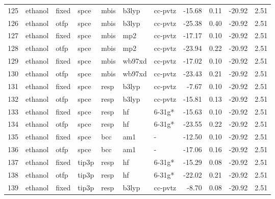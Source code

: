 \begin{tabular}{lllllllrrrr}
125 &                       ethanol &  fixed &   spce &   mbis &   b3lyp &      cc-pvtz &      -15.68 &     0.11 &      -20.92 &      2.51 \\
126 &                       ethanol &   otfp &   spce &   mbis &   b3lyp &      cc-pvtz &      -25.38 &     0.40 &      -20.92 &      2.51 \\
127 &                       ethanol &  fixed &   spce &   mbis &     mp2 &      cc-pvtz &      -17.17 &     0.10 &      -20.92 &      2.51 \\
128 &                       ethanol &   otfp &   spce &   mbis &     mp2 &      cc-pvtz &      -23.94 &     0.22 &      -20.92 &      2.51 \\
129 &                       ethanol &  fixed &   spce &   mbis &  wb97xd &      cc-pvtz &      -17.02 &     0.10 &      -20.92 &      2.51 \\
130 &                       ethanol &   otfp &   spce &   mbis &  wb97xd &      cc-pvtz &      -23.43 &     0.21 &      -20.92 &      2.51 \\
131 &                       ethanol &  fixed &   spce &   resp &   b3lyp &      cc-pvtz &       -7.67 &     0.10 &      -20.92 &      2.51 \\
132 &                       ethanol &   otfp &   spce &   resp &   b3lyp &      cc-pvtz &      -15.81 &     0.13 &      -20.92 &      2.51 \\
133 &                       ethanol &  fixed &   spce &   resp &      hf &       6-31g* &      -15.63 &     0.10 &      -20.92 &      2.51 \\
134 &                       ethanol &   otfp &   spce &   resp &      hf &       6-31g* &      -23.55 &     0.22 &      -20.92 &      2.51 \\
135 &                       ethanol &  fixed &   spce &    bcc &     am1 &            - &      -12.50 &     0.10 &      -20.92 &      2.51 \\
136 &                       ethanol &   otfp &   spce &    bcc &     am1 &            - &      -17.06 &     0.16 &      -20.92 &      2.51 \\
137 &                       ethanol &  fixed &  tip3p &   resp &      hf &       6-31g* &      -15.29 &     0.08 &      -20.92 &      2.51 \\
138 &                       ethanol &   otfp &  tip3p &   resp &      hf &       6-31g* &      -22.02 &     0.21 &      -20.92 &      2.51 \\
139 &                       ethanol &  fixed &  tip3p &   resp &   b3lyp &      cc-pvtz &       -8.70 &     0.08 &      -20.92 &      2.51 \\

\end{tabular}
